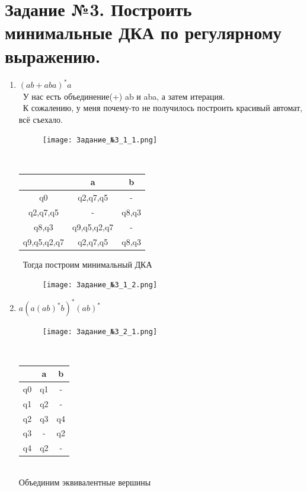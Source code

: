 \documentclass[a4paper]{article}
\begin{document}
\section{Задание №3. Построить минимальные ДКА по регулярному выражению.}
\begin{enumerate}
\item $(ab+aba)^*a$\\
\ У нас есть объединение(+) ab и aba, а затем итерация. \\
\ К сожалению, у меня почему-то не получилось построить красивый автомат, всё съехало. \\
\begin{figure}[h]
\centering
\texttt{[image: Задание\_№3\_1\_1.png]}
\end{figure}
\\
\begin{tabular}{|*{3}{c|}}
\textbf{ } & a & b \\
\hline\hline
q0 & q2,q7,q5 & - \\
\hline\hline
q2,q7,q5 & - & q8,q3 \\
\hline\hline
q8,q3 & q9,q5,q2,q7 & - \\
\hline\hline
q9,q5,q2,q7 & q2,q7,q5 & q8,q3 \\
\end{tabular}

\ Тогда построим минимальный ДКА \\
\begin{figure}[h]
\centering
\texttt{[image: Задание\_№3\_1\_2.png]}
\end{figure}

\item $a(a(ab)^*b)^*(ab)^*$\\

\begin{figure}[h]
\centering
\texttt{[image: Задание\_№3\_2\_1.png]}
\end{figure}
\\
\begin{tabular}{|*{3}{c|}}
\textbf{ } & a & b \\
\hline\hline
q0 & q1 & - \\
\hline\hline
q1 & q2 & - \\
\hline\hline
q2 & q3 & q4 \\
\hline\hline
q3 & - & q2 \\
\hline\hline
q4 & q2 & - \\
\end{tabular}
\\Объединим эквивалентные вершины\\


\end{enumerate}
\end{document}
